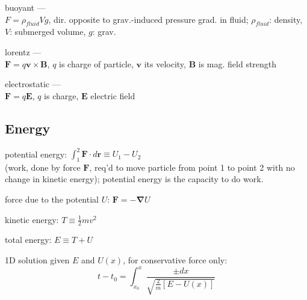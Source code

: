 \documentclass[letterpaper,landscape,10pt]{article}
\newenvironment{mydescription}
{\begin{description}
	\setlength{\itemsep}{0pt}
	\setlength{\parskip}{0pt}
	\setlength{\parsep}{-1pt}}
{\end{description}}
\begin{document}
{\begin{multicols}{3}
\begin{mydescription}


		\item[buoyant] --- \\
			$F = \rho_{fluid}Vg$, dir. opposite to grav.-induced pressure grad.
			in fluid; $\rho_{fluid}$: density, $V$: submerged volume,
			$g$: grav. \\

		\item[lorentz] --- \\
			$\mathbf{F} = q\mathbf{v}\times\mathbf{B}$,
			$q$ is charge of particle, $\mathbf{v}$ its velocity,
			$\mathbf{B}$ is mag. field strength  \\

		\item[electrostatic] --- \\
			$\mathbf{F} = q\mathbf{E}$, $q$ is charge, $\mathbf{E}$ electric field
		\end{mydescription}
	
	\subsection*{Energy}
		\begin{mydescription}
			\item[potential energy:]
				$\displaystyle\int_1^2\mathbf{F}\cdot d\mathbf{r} \equiv U_1 - U_2$\\
				(work, done by force $\mathbf{F}$, req'd to move particle from
				point 1 to point 2 with no change in kinetic energy); potential
				energy is the capacity to do work.  \\
			\item[force due to the potential $U$:]
				$\mathbf{F} = -\mathbf{\nabla}U$  \\
			\item[kinetic energy:]
				$T \equiv \frac{1}{2}mv^2$  \\
			\item[total energy:]
				$E \equiv T + U$  \\
			\item[1D solution given $E$ and $U(x)$,]
				for conservative force only:\\
				$$
					t-t_0 = \int_{x_0}^x\frac{\pm dx}
					{\sqrt{\frac{2}{m}\left[E-U(x)\right]}}
				$$
		\end{mydescription}


\end{multicols}}
\end{document}
